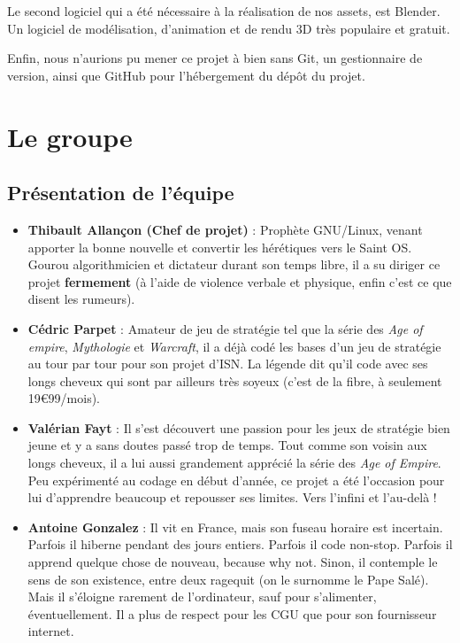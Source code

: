 \documentclass[12pt]{report}
\begin{document}
Le second logiciel qui a été nécessaire à la réalisation de nos assets, est
Blender. Un logiciel de modélisation, d’animation et de rendu 3D très populaire
et gratuit.

Enfin, nous n’aurions pu mener ce projet à bien sans Git, un gestionnaire de
version, ainsi que GitHub pour l'hébergement du dépôt du projet.

\chapter{Le groupe}

\section{Présentation de l'équipe}

\begin{itemize}[label=\textbullet]
    \item \textbf{Thibault Allançon (Chef de projet)} : Prophète GNU/Linux,
        venant apporter la bonne nouvelle et convertir les hérétiques vers le
        Saint OS. Gourou algorithmicien et dictateur durant son temps libre, il
        a su diriger ce projet \textbf{fermement} (à l’aide de violence verbale
        et physique, enfin c’est ce que disent les rumeurs).
    \item \textbf{Cédric Parpet} : Amateur de jeu de stratégie tel que la série
        des \textit{Age of empire}, \textit{Mythologie} et \textit{Warcraft}, il
        a déjà codé les bases d’un jeu de stratégie au tour par tour pour son
        projet d’ISN. La légende dit qu’il code avec ses longs cheveux qui sont
        par ailleurs très soyeux (c’est de la fibre, à seulement
        19\euro99/mois).
    \item \textbf{Valérian Fayt} : Il s’est découvert une passion pour les jeux
        de stratégie bien jeune et y a sans doutes passé trop de temps. Tout
        comme son voisin aux longs cheveux, il a lui aussi grandement apprécié
        la série des \textit{Age of Empire}. Peu expérimenté au codage en début
        d'année, ce projet a été l'occasion pour lui d'apprendre beaucoup et
        repousser ses limites. Vers l’infini et l’au-delà !
    \item \textbf{Antoine Gonzalez} : Il vit en France, mais son fuseau horaire
        est incertain. Parfois il hiberne pendant des jours entiers. Parfois il
        code non-stop. Parfois il apprend quelque chose de nouveau, because why
        not. Sinon, il contemple le sens de son existence, entre deux ragequit
        (on le surnomme le Pape Salé). Mais il s’éloigne rarement de
        l’ordinateur, sauf pour s’alimenter, éventuellement. Il a plus de
        respect pour les CGU que pour son fournisseur internet.
\end{itemize}
\end{document}
